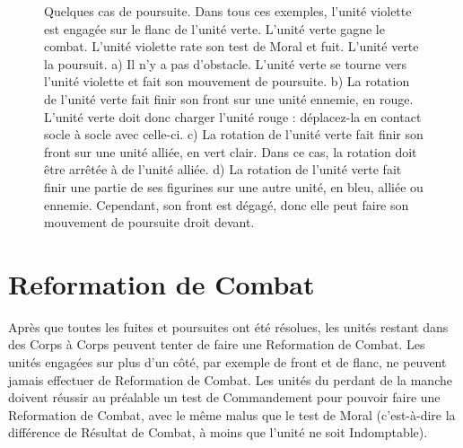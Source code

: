 \begin{figure}[!htbp]
\begin{minipage}{0.53\textwidth}
\def\svgwidth{\textwidth}

\end{minipage}\hfill\begin{minipage}{0.44\textwidth}
\caption{Quelques cas de poursuite.\vspace*{10pt}\newline
Dans tous ces exemples, l'unité violette est engagée sur le flanc de l'unité verte. L'unité verte gagne le combat. L'unité violette rate son test de Moral et fuit. L'unité verte la poursuit.\vspace*{10pt}\newline
a) Il n'y a pas d'obstacle. L'unité verte se tourne vers l'unité violette et fait son mouvement de poursuite.\vspace*{10pt}\newline
b) La rotation de l'unité verte fait finir son front sur une unité ennemie, en rouge. L'unité verte doit donc charger l'unité rouge : déplacez-la en contact socle à socle avec celle-ci.\vspace*{10pt}\newline
c) La rotation de l'unité verte fait finir son front sur une unité alliée, en vert clair. Dans ce cas, la rotation doit être arrêtée à  de l'unité alliée.\vspace*{10pt}\newline
d) La rotation de l'unité verte fait finir une partie de ses figurines sur une autre unité, en bleu, alliée ou ennemie. Cependant, son front est dégagé, donc elle peut faire son mouvement de poursuite droit devant.}
\label{figure/pursuit}
\end{minipage}
\end{figure}

\clearpage
\section{Reformation de Combat}

Après que toutes les fuites et poursuites ont été résolues, les unités restant dans des Corps à Corps peuvent tenter de faire une Reformation de Combat. Les unités engagées sur plus d'un côté, par exemple de front et de flanc, ne peuvent jamais effectuer de Reformation de Combat. Les unités du perdant de la manche doivent réussir au préalable un test de Commandement pour pouvoir faire une Reformation de Combat, avec le même malus que le test de Moral (c'est-à-dire la différence de Résultat de Combat, à moins que l'unité ne soit Indomptable).


